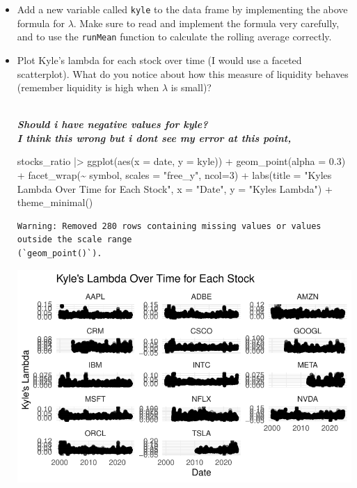 \documentclass[
  letterpaper,
  DIV=11,
  numbers=noendperiod]{scrartcl}
\newenvironment{Shaded}{\begin{snugshade}}{\end{snugshade}}
\newcommand{\AttributeTok}[1]{\textcolor[rgb]{0.40,0.45,0.13}{#1}}
\newcommand{\DecValTok}[1]{\textcolor[rgb]{0.68,0.00,0.00}{#1}}
\newcommand{\FloatTok}[1]{\textcolor[rgb]{0.68,0.00,0.00}{#1}}
\newcommand{\FunctionTok}[1]{\textcolor[rgb]{0.28,0.35,0.67}{#1}}
\newcommand{\NormalTok}[1]{\textcolor[rgb]{0.00,0.23,0.31}{#1}}
\newcommand{\SpecialCharTok}[1]{\textcolor[rgb]{0.37,0.37,0.37}{#1}}
\newcommand{\StringTok}[1]{\textcolor[rgb]{0.13,0.47,0.30}{#1}}
\begin{document}
\begin{itemize}
\item
  Add a new variable called \texttt{kyle} to the data frame by
  implementing the above formula for \(\lambda\). Make sure to read and
  implement the formula very carefully, and to use the \texttt{runMean}
  function to calculate the rolling average correctly.
\item
  Plot Kyle's lambda for each stock over time (I would use a faceted
  scatterplot). What do you notice about how this measure of liquidity
  behaves (remember liquidity is high when \(\lambda\) is small)?\\
  \strut \\
  \textbf{\emph{Should i have negative values for kyle?\\
  I think this wrong but i dont see my error at this point,}}

\begin{Shaded}
\begin{Highlighting}[]
\NormalTok{stocks\_ratio }\SpecialCharTok{|\textgreater{}} 
  \FunctionTok{ggplot}\NormalTok{(}\FunctionTok{aes}\NormalTok{(}\AttributeTok{x =}\NormalTok{ date, }\AttributeTok{y =}\NormalTok{ kyle)) }\SpecialCharTok{+}
  \FunctionTok{geom\_point}\NormalTok{(}\AttributeTok{alpha =} \FloatTok{0.3}\NormalTok{) }\SpecialCharTok{+}
  \FunctionTok{facet\_wrap}\NormalTok{(}\SpecialCharTok{\textasciitilde{}}\NormalTok{ symbol, }\AttributeTok{scales =} \StringTok{"free\_y"}\NormalTok{, }\AttributeTok{ncol=}\DecValTok{3}\NormalTok{) }\SpecialCharTok{+}
  \FunctionTok{labs}\NormalTok{(}\AttributeTok{title =} \StringTok{"Kyle\textquotesingle{}s Lambda Over Time for Each Stock"}\NormalTok{,}
       \AttributeTok{x =} \StringTok{"Date"}\NormalTok{, }
       \AttributeTok{y =} \StringTok{"Kyle\textquotesingle{}s Lambda"}\NormalTok{) }\SpecialCharTok{+}
  \FunctionTok{theme\_minimal}\NormalTok{()}
\end{Highlighting}
\end{Shaded}

\begin{verbatim}
Warning: Removed 280 rows containing missing values or values outside the scale range
(`geom_point()`).
\end{verbatim}

  \includegraphics{Lab4_files/figure-pdf/unnamed-chunk-4-1.pdf}


\end{itemize}
\end{document}
